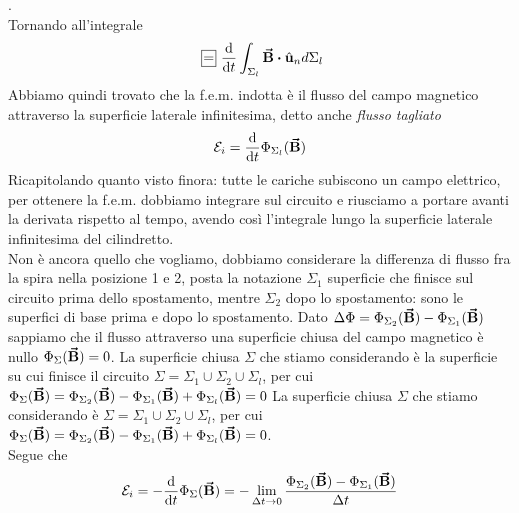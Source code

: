 \begin{demonstration}
	 .\\
	Tornando all'integrale 
	\begin{gather*}
		\squarequal \dv{t}\int_{\Sigma_l}\vba B\vdot\vbh u_n d\Sigma_l
	\end{gather*}
	Abbiamo quindi trovato che la f.e.m. indotta è il flusso del campo magnetico attraverso la superficie laterale infinitesima, detto anche \textit{flusso tagliato}
	\begin{equation*}
		\mathcal{E}_i=\dv{t}\Phi_{\Sigma_l}(\vb*{\va{B}})
	\end{equation*}
	Ricapitolando quanto visto finora: tutte le cariche subiscono un campo elettrico, per ottenere la f.e.m. dobbiamo integrare sul circuito e riusciamo a portare avanti la derivata rispetto al tempo, avendo così l'integrale lungo la superficie laterale infinitesima del cilindretto.\\
	Non è ancora quello che vogliamo, dobbiamo %
	considerare la differenza di flusso fra la spira nella posizione 1 e 2, posta la notazione $\Sigma_1$ superficie che finisce sul circuito prima dello spostamento, mentre $\Sigma_2$ dopo lo spostamento: sono le superfici di base prima e dopo lo spostamento. Dato $\Delta\Phi=\Phi_{\Sigma_2}(\vb*{\va{B}}) - \Phi_{\Sigma_1}(\vb*{\va{B}})$ sappiamo che il flusso attraverso una superficie chiusa del campo magnetico è nullo $\Phi_\Sigma(\vb*{\va{B}})=0$. La superficie chiusa $\Sigma$ che stiamo considerando è la superficie su cui finisce il circuito $\Sigma=\Sigma_1\cup\Sigma_2\cup\Sigma_l$, per cui $\Phi_\Sigma(\vb*{\va{B}})=\Phi_{\Sigma_2}(\vb*{\va{B}})-\Phi_{\Sigma_1}(\vb*{\va{B}})+\Phi_{\Sigma_l}(\vb*{\va{B}})=0$
	La superficie chiusa $\Sigma$ che stiamo considerando è $\Sigma=\Sigma_1\cup\Sigma_2\cup\Sigma_l$, per cui $\Phi_\Sigma(\vb*{\va{B}})=\Phi_{\Sigma_2}(\vb*{\va{B}})-\Phi_{\Sigma_1}(\vb*{\va{B}})+\Phi_{\Sigma_l}(\vb*{\va{B}})=0$. \\
	Segue che 
	\begin{gather*}
		\mathcal{E}_i=-\dv{t}\Phi_\Sigma(\vb*{\va{B}})=-\lim_{\Delta t\to 0}\frac{\Phi_{\Sigma_2}(\vb*{\va{B}})- \Phi_{\Sigma_1}(\vb*{\va{B}})}{\Delta t}
	\end{gather*}
\end{demonstration}

